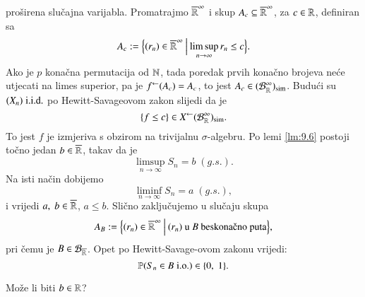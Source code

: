 \begin{pr}
\begin{equation*}
    \end{equation*}
    pro\v sirena slu\v cajna varijabla.
    Promatrajmo $\overline{\mathbb{R}}^{\infty}$ i skup $A_c \subseteq \overline{\mathbb{R}}^\infty$, za $c \in \mathbb{R}$, definiran sa
    \begin{equation*}
        A_c := \Big\{ {(r_n) \in \overline{\mathbb{R}}^\infty} \: \Big| \: {\limsup\limits_{n \to \infty} r_n \leq c} \Big\}.
    \end{equation*}
    Ako je $p$ kona\v cna permutacija od $\mathbb{N}$, tada poredak prvih kona\v cno brojeva ne\' ce utjecati na limes superior, pa je ${f}^{\leftarrow} (A_c) = A_c$, to jest $A_c \in (\mathcal{B}_{\mathbb{R}}^\infty)_{\mathrm{sim}}$.
    Budu\' ci su $(X_n) \; \mathrm{i.i.d.}$ po Hewitt-Savageovom zakon slijedi da je
    \begin{equation*}
        \{f \leq c\} \in {X}^{\leftarrow} (\mathcal{B}_{\mathbb{R}}^\infty)_{\mathrm{sim}}.
    \end{equation*}
    To jest $f$ je izmjeriva s obzirom na trivijalnu $\sigma$-algebru.
    Po lemi \ref{lm:9.6} postoji to\v cno jedan $b \in \overline{\mathbb{R}}$, takav da je
    \begin{equation*}
        \limsup\limits_{n \to \infty} S_n = b \; (g.s.).
    \end{equation*}
    Na isti na\v cin dobijemo
    \begin{equation*}
        \liminf\limits_{n \to \infty} S_n = a \; (g.s.),
    \end{equation*}
    i vrijedi $a, \; b \in \overline{\mathbb{R}}$, $a \leq b$.
    Sli\v cno zaklju\v cujemo u slu\v caju skupa
    \begin{equation*}
        A_B := \bigSkup{(r_n) \in \extReal^\infty}{(r_n) \textnormal{ u $B$ beskona\v cno puta}},
    \end{equation*}
    pri \v cemu je $B \in \mathcal{B}_{\overline{\mathbb{R}}}$.
    Opet po Hewitt-Savage-ovom zakonu vrijedi:
    \begin{equation*}
        \mathbb{P}({S_n \in B \; \mathrm{i.o.}}) \in \{0, \; 1\}.
    \end{equation*}

    Mo\v ze li biti $b \in \mathbb{R}$?


\end{pr}
